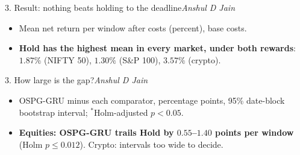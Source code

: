 \documentclass[aspectratio=169,11pt]{beamer}
\newcommand{\by}[1]{\hfill{\normalfont\small\itshape #1}}
\begin{document}
\begin{frame}{3. Result: nothing beats holding to the deadline\by{Anshul D Jain}}
\centering\scriptsize
\resizebox{\linewidth}{!}{}

\vspace{6pt}\normalsize
\begin{itemize}\small
\item Mean net return per window after costs (percent), base costs.
\item \textbf{Hold has the highest mean in every market, under both rewards}: $1.87\%$ (NIFTY 50),
  $1.30\%$ (S\&P 100), $3.57\%$ (crypto).
\end{itemize}
\end{frame}

\begin{frame}{3. How large is the gap?\by{Anshul D Jain}}
\centering\scriptsize
\resizebox{\linewidth}{!}{}

\vspace{6pt}\normalsize
\begin{itemize}\small
\item OSPG-GRU minus each comparator, percentage points, 95\% date-block bootstrap interval;
  $^{*}$Holm-adjusted $p<0.05$.
\item \textbf{Equities: OSPG-GRU trails Hold by $0.55$--$1.40$ points per window}
  (Holm $p\le0.012$). Crypto: intervals too wide to decide.
\end{itemize}
\end{frame}
\end{document}

